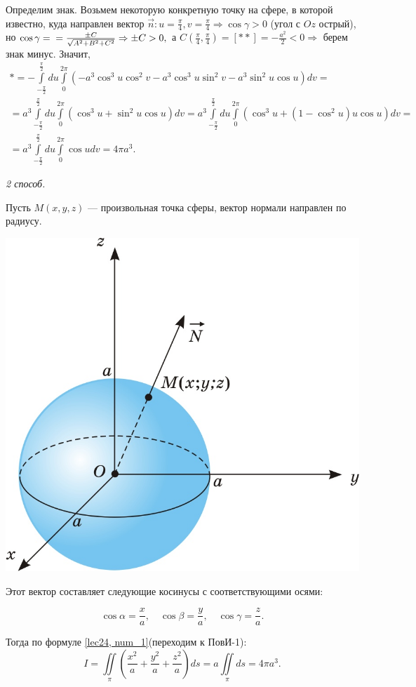 \documentclass[../../main.tex]{subfiles}
\begin{document}
\begin{example}
	Определим знак. Возьмем некоторую конкретную точку на сфере, в которой известно, куда направлен вектор $\vec{n}: u=\frac{\pi}{4}, v=\frac{\pi}{4}\Rightarrow \cos\gamma > 0$ (угол с $Oz$ острый), но $\cos\gamma =\\= \frac{\pm C}{\sqrt{A^2 + B^2 + C^2}}\Rightarrow \pm C>0,$ а $C\left(\frac{\pi}{4}, \frac{\pi}{4}\right)=\left[**\right]=-\frac{a^2}{2}<0\Rightarrow$ берем знак минус. Значит,
	\begin{multline*}*=-\int\limits_{-\frac{\pi}{2}}^{\frac{\pi}{2}}du\int\limits_0^{2\pi}(-a^3\cos^3 u \cos^2 v - a^3\cos^3 u \sin^2 v - a^3\sin^2 u \cos u)dv =\\= a^3 \int\limits_{-\frac{\pi}{2}}^{\frac{\pi}{2}}du\int\limits_0^{2\pi}(\cos^3 u + \sin^2 u \cos u)dv = a^3 \int\limits_{-\frac{\pi}{2}}^{\frac{\pi}{2}}du\int\limits_0^{2\pi}(\cos^3 u + (1-\cos^2 u) u \cos u)dv = \\ = a^3 \int\limits_{-\frac{\pi}{2}}^{\frac{\pi}{2}}du\int\limits_0^{2\pi}\cos u dv = 4\pi a^3.\end{multline*}
	
	\emph{2 способ.}
		
	Пусть $M(x, y, z)$ --- произвольная точка сферы, вектор нормали направлен по радиусу.
	
	\begin{center}
		\includegraphics[scale = 0.27]{lec24_1.jpg}
	\end{center}
	
	Этот вектор составляет следующие косинусы с соответствующими осями:
	
	$$\cos\alpha=\frac{x}{a},\quad \cos\beta=\frac{y}{a},\quad \cos\gamma=\frac{z}{a}.$$ 
	
	 Тогда по формуле \eqref{lec24, num_1}(переходим к ПовИ-1):
	$$I=\iint\limits_\pi\left(\frac{x^2}{a} + \frac{y^2}{a} + \frac{z^2}{a}\right)ds = a \iint\limits_\pi ds = 4\pi a^3.$$
\end{example}
\end{document}
